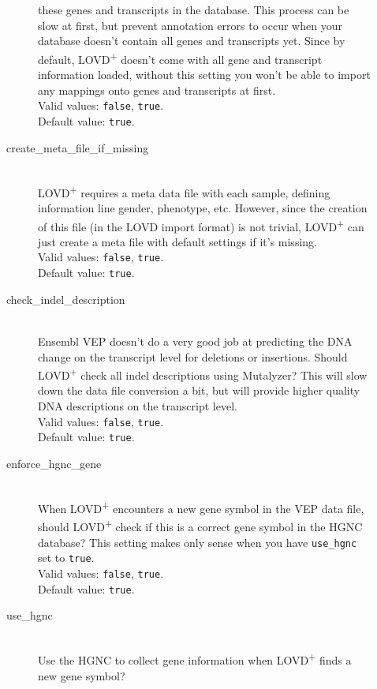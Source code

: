 \begin{description}
\begin{description}
       these genes and transcripts in the database.
      This process can be slow at first, but prevent annotation errors to occur
       when your database doesn't contain all genes and transcripts yet.
      Since by default, LOVD\textsuperscript{+} doesn't come with all gene and transcript information loaded,
       without this setting you won't be able to import any mappings onto genes and transcripts at first.\\
      Valid values: \texttt{false}, \texttt{true}.\\
      Default value: \texttt{true}.
    \item[create\_meta\_file\_if\_missing] \hfill \\
      LOVD\textsuperscript{+} requires a meta data file with each sample,
       defining information line gender, phenotype, etc.
      However, since the creation of this file (in the LOVD import format) is not trivial,
       LOVD\textsuperscript{+} can just create a meta file with default settings if it's missing.\\
      Valid values: \texttt{false}, \texttt{true}.\\
      Default value: \texttt{true}.
    \item[check\_indel\_description] \hfill \\
      Ensembl VEP doesn't do a very good job at predicting the DNA change
       on the transcript level for deletions or insertions.
      Should LOVD\textsuperscript{+} check all indel descriptions using Mutalyzer?
      This will slow down the data file conversion a bit,
       but will provide higher quality DNA descriptions on the transcript level.\\
      Valid values: \texttt{false}, \texttt{true}.\\
      Default value: \texttt{true}.
    \item[enforce\_hgnc\_gene] \hfill \\
      When LOVD\textsuperscript{+} encounters a new gene symbol in the VEP data file,
       should LOVD\textsuperscript{+} check if this is a correct gene symbol in the HGNC database?
      This setting makes only sense when you have \texttt{use\_hgnc} set to \texttt{true}.\\
      Valid values: \texttt{false}, \texttt{true}.\\
      Default value: \texttt{true}.
    \item[use\_hgnc] \hfill \\
      Use the HGNC to collect gene information when LOVD\textsuperscript{+} finds a new gene symbol?

\end{description}
\end{description}
